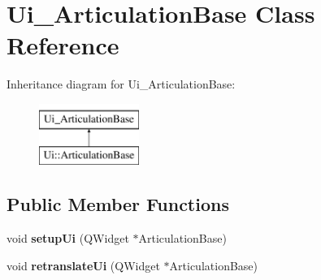 \hypertarget{class_ui___articulation_base}{}\section{Ui\+\_\+\+Articulation\+Base Class Reference}
\label{class_ui___articulation_base}
Inheritance diagram for Ui\+\_\+\+Articulation\+Base\+:\begin{figure}[H]
\begin{center}
\leavevmode
\includegraphics[height=2.000000cm]{class_ui___articulation_base}
\end{center}
\end{figure}
\subsection*{Public Member Functions}
\begin{DoxyCompactItemize}
\item 
\mbox{\label{class_ui___articulation_base_ab7466e95de33713cb208dd32fa4528a9}} 
void {\bfseries setup\+Ui} (Q\+Widget $\ast$Articulation\+Base)
\item 
\mbox{\label{class_ui___articulation_base_a1b7a59ca53de554d9f00f0a52bcc4146}} 
void {\bfseries retranslate\+Ui} (Q\+Widget $\ast$Articulation\+Base)
\end{DoxyCompactItemize}
